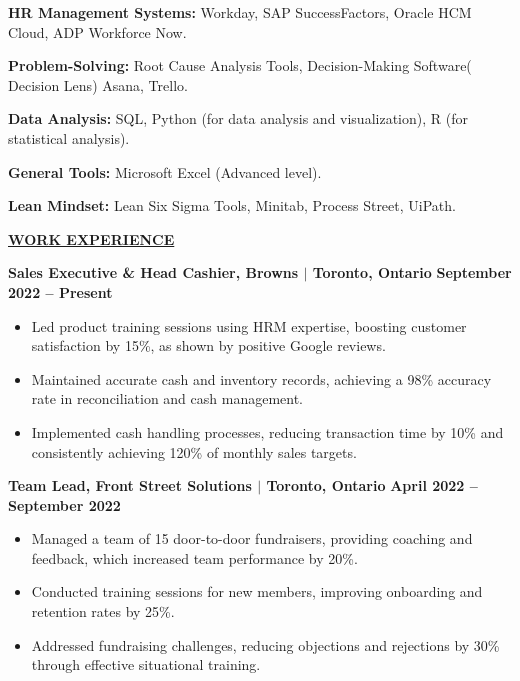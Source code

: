 \documentclass{article}
\begin{document}
\noindent \textbf{HR Management Systems:} Workday, SAP SuccessFactors, Oracle HCM Cloud, ADP Workforce Now.

\noindent\textbf{Problem-Solving:} Root Cause Analysis Tools, Decision-Making Software( Decision Lens) Asana, Trello.

\noindent \textbf{Data Analysis:} SQL, Python (for data analysis and visualization), R (for statistical analysis).

\noindent \textbf{General Tools:} Microsoft Excel (Advanced level).

\noindent \textbf{Lean Mindset:} Lean Six Sigma Tools, Minitab, Process Street, UiPath.
\vspace{2mm} 


% 
%
\noindent \textbf{\underline{WORK EXPERIENCE}} 

\noindent \textbf{Sales Executive \& Head Cashier, Browns $\mid$ Toronto, Ontario} \hfill \textbf{September 2022 – Present}
\begin{itemize}[noitemsep,nolistsep,leftmargin=*]
\item {\small Led product training sessions using HRM expertise, boosting customer satisfaction by 15\%, as shown by positive Google reviews.}
\item {\small Maintained accurate cash and inventory records, achieving a 98\% accuracy rate in reconciliation and cash management.}
\item {\small Implemented cash handling processes, reducing transaction time by 10\% and consistently achieving 120\% of monthly sales targets.}
\end{itemize}

\vspace{1mm}

\noindent \textbf{Team Lead, Front Street Solutions $\mid$ Toronto, Ontario} \hfill \textbf{April 2022 – September 2022}
\begin{itemize}[noitemsep,nolistsep,leftmargin=*]
\item {\small Managed a team of 15 door-to-door fundraisers, providing coaching and feedback, which increased team performance by 20\%.}
\item {\small Conducted training sessions for new members, improving onboarding and retention rates by 25\%.}
\item {\small Addressed fundraising challenges, reducing objections and rejections by 30\% through effective situational training.}
\end{itemize}
\end{document}
